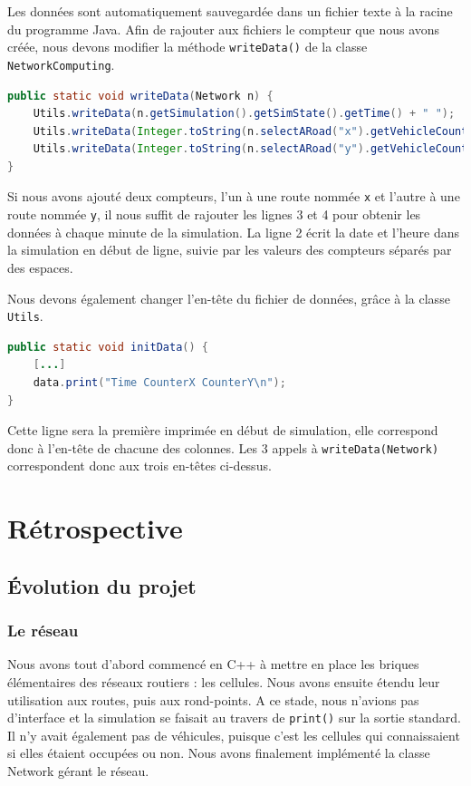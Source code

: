 \documentclass[a4paper,11pt, titlepage]{extarticle}
\begin{document}
Les données sont automatiquement sauvegardée dans un fichier texte à la racine du programme Java. Afin de rajouter aux fichiers le compteur que nous avons créée, nous devons modifier la méthode \texttt{writeData()} de la classe \texttt{NetworkComputing}.

\begin{lstlisting}[language=Java]
public static void writeData(Network n) {
	Utils.writeData(n.getSimulation().getSimState().getTime() + " ");
	Utils.writeData(Integer.toString(n.selectARoad("x").getVehicleCounter().getCounter())+" ");
	Utils.writeData(Integer.toString(n.selectARoad("y").getVehicleCounter().getCounter())+"\n");
}
\end{lstlisting}

Si nous avons ajouté deux compteurs, l'un à une route nommée \texttt{x} et l'autre à une route nommée \texttt{y}, il nous suffit de rajouter les lignes 3 et 4 pour obtenir les données à chaque minute de la simulation. La ligne 2 écrit la date et l'heure dans la simulation en début de ligne, suivie par les valeurs des compteurs séparés par des espaces.

Nous devons également changer l'en-tête du fichier de données, grâce à la classe \texttt{Utils}. 

\begin{lstlisting}[language=Java]
public static void initData() {
	[...]
	data.print("Time CounterX CounterY\n");
}
\end{lstlisting}

Cette ligne sera la première imprimée en début de simulation, elle correspond donc à l'en-tête de chacune des colonnes. Les 3 appels à \texttt{writeData(Network)} correspondent donc aux trois en-têtes ci-dessus.

\newpage

\section{Rétrospective}

\subsection{Évolution du projet}

\subsubsection{Le réseau}

Nous avons tout d'abord commencé en C++ à mettre en place les briques élémentaires des réseaux routiers : les cellules. Nous avons ensuite étendu leur utilisation aux routes, puis aux rond-points. A ce stade, nous n'avions pas d'interface et la simulation se faisait au travers de \texttt{print()} sur la sortie standard. Il n'y avait également pas de véhicules, puisque c'est les cellules qui connaissaient si elles étaient occupées ou non. Nous avons finalement implémenté la classe Network gérant le réseau.
\end{document}
